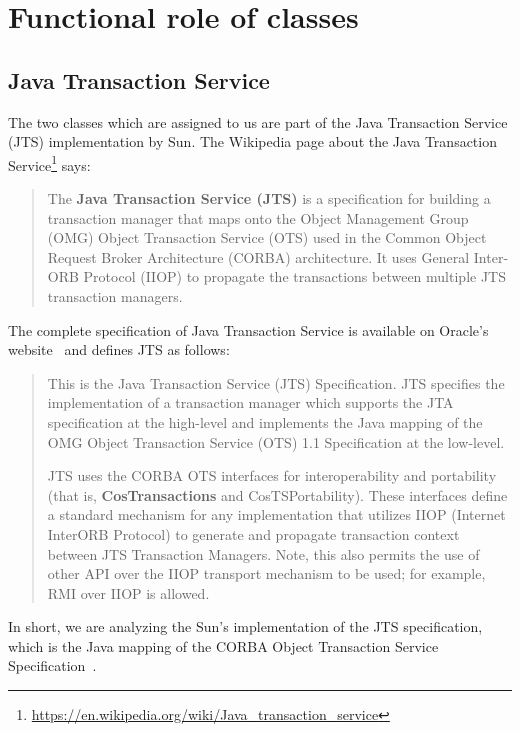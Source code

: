\section{Functional role of classes}
\label{sec:functional-role}

\subsection{Java Transaction Service}
The two classes which are assigned to us are part of the Java Transaction Service (JTS) implementation by Sun.
The Wikipedia page about the Java Transaction Service\footnote{\url{https://en.wikipedia.org/wiki/Java_transaction_service}} says:
\begin{quote}
The \textbf{Java Transaction Service (JTS)} is a specification for building a transaction manager that maps onto the Object Management Group (OMG) Object Transaction Service (OTS) used in the Common Object Request Broker Architecture (CORBA) architecture. It uses General Inter-ORB Protocol (IIOP) to propagate the transactions between multiple JTS transaction managers.
\end{quote}

The complete specification of Java Transaction Service is available on Oracle's website~\cite{jts-specification} and defines JTS as follows:
\begin{quotation}
This is the Java Transaction Service (JTS) Specification.
JTS specifies the
implementation of a transaction manager which supports the JTA specification at
the high-level and implements the Java mapping of the OMG Object Transaction
Service (OTS) 1.1 Specification at the low-level.

JTS uses the CORBA OTS interfaces for interoperability and portability (that is, \textbf{CosTransactions} and CosTSPortability).
These interfaces define a standard mechanism for any implementation that utilizes IIOP (Internet InterORB Protocol) to generate and
propagate transaction context between JTS Transaction Managers. Note, this also
permits the use of other API over the IIOP transport mechanism to be used; for
example, RMI over IIOP is allowed.
\end{quotation}

In short, we are analyzing the Sun's implementation of the JTS specification, which is the Java mapping of the CORBA Object Transaction Service Specification~\cite{omg-ots}.

